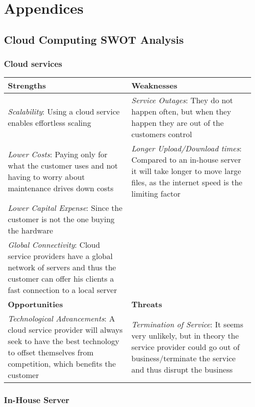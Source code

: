 \section{Appendices}
\subsection{Cloud Computing SWOT Analysis}

\subsubsection{Cloud services}

\renewcommand{\arraystretch}{1.5}
\begin{center}
\begin{tabular}{ | p{0.5\linewidth} | p{0.5\linewidth} | } 
 \hline
 \textbf{Strengths} & \textbf{Weaknesses}\\ 
\hline
 \textit{Scalability}: Using a cloud service enables effortless scaling & \textit{Service Outages}: They do not happen often, but when they happen they are out of the customers control \\ 
\textit{Lower Costs}: Paying only for what the customer uses and not having to worry about maintenance drives down costs & \textit{Longer Upload/Download times}:  Compared to an in-house server it will take longer to move large files, as the internet speed is the limiting factor\\
\textit{Lower Capital Expense}: Since the customer is not the one buying the hardware & \\ 
 \textit{Global Connectivity}: Cloud service providers have a global network of servers and thus the customer can offer his clients a fast connection to a local server & \\
 \hline
 \textbf{Opportunities} & \textbf{Threats}  \\ 
 \hline
\textit{Technological Advancements}: A cloud service provider will always seek to have the best technology to offset themselves from competition, which benefits the customer & \textit{Termination of Service}: It seems very unlikely, but in theory the service provider could go out of business/terminate the service and thus disrupt the business \\
\hline 
\end{tabular}
\end{center}

\subsubsection{In-House Server}

